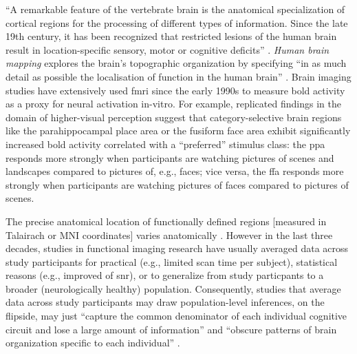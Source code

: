 

``A remarkable feature of the vertebrate brain is the anatomical specialization
of cortical regions for the processing of different types of information. Since
the late 19th century, it has been recognized that restricted lesions of the
human brain result in location-specific sensory, motor or cognitive deficits''
\citep{cohen1994localization}.
\textit{Human brain mapping} \citep[e.g.,][]{raichle2009brief} explores the
brain's topographic organization \citep[e.g.,][]{eickhoff2018topographic} by
specifying ``in as much detail as possible the localisation of function in the
human brain'' \citep{savoy2001history}.
Brain imaging studies have extensively used \ac{fmri} since the early 1990s to
measure \ac{bold} activity as a proxy for neural activation in-vitro.
For example, replicated findings in the domain of higher-visual perception
suggest that category-selective brain regions like the parahippocampal place
area \citep{epstein1998ppa, epstein1999parahippocampal} or the fusiform face
area \citep{kanwisher1997ffa, kanwisher2006fusiform} exhibit significantly
increased \ac{bold} activity correlated with a ``preferred'' stimulus class:
%
the \ac{ppa} responds more strongly when participants are watching pictures of
scenes and landscapes compared to pictures of, e.g., faces;
%
vice versa, the \ac{ffa} responds more strongly when participants are watching
pictures of faces compared to pictures of scenes.

The precise anatomical location of functionally defined regions [measured in
Talairach or MNI coordinates] varies anatomically \citep{friston2006critique,
saxe2006divide}.
%
However in the last three decades, studies in functional imaging research have
usually averaged data across study participants for
%
practical (e.g., limited scan time per subject),
%
statistical reasons (e.g., improved of \ac{snr}),
%
or to generalize from study particpants to a broader (neurologically healthy)
population.
%
Consequently, studies that average data across study participants may draw
population-level inferences, on the flipside, may just ``capture the common
denominator of each individual cognitive circuit and lose a large amount of
information'' \citep{pinel2007fast} and ``obscure patterns of brain organization
specific to each individual'' \citep{laumann2015functional}.

